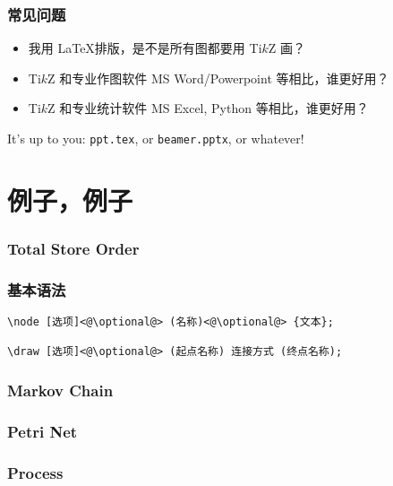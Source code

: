 \documentclass[usenames,xcolor=svgnames,11pt,sans,handout]{beamer}
\let\t\texttt
\begin{document}
\begin{frame}
    \frametitle{常见问题}

    \begin{itemize}
        \item 我用 \LaTeX 排版，是不是所有图都要用 Ti$k$Z 画？
        \pause
        \item Ti$k$Z 和专业作图软件 MS Word/Powerpoint 等相比，谁更好用？
        \pause
        \item Ti$k$Z 和专业统计软件 MS Excel, Python 等相比，谁更好用？
    \end{itemize}

    \pause
    \vspace{20pt}
    It's up to you: \t{ppt.tex}, or \t{beamer.pptx}, or whatever!
\end{frame}

\section{例子，例子}

\begin{frame}
    \frametitle{Total Store Order}

    \centering
\end{frame}

\begin{frame}[fragile]
    \frametitle{基本语法}

    \begin{lstlisting}
\node [选项]<@\optional@> (名称)<@\optional@> {文本};

\draw [选项]<@\optional@> (起点名称) 连接方式 (终点名称);
    \end{lstlisting}
\end{frame}

\begin{frame}
    \frametitle{Markov Chain}

    \centering
\end{frame}

\begin{frame}
    \frametitle{Petri Net}

    \centering
\end{frame}

\begin{frame}
    \frametitle{Process}

    \centering
\end{frame}
\end{document}
